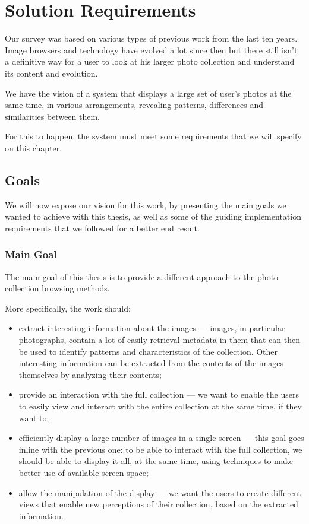 \chapter{Solution Requirements} %
\label{chapter:solution_requirements}

Our survey was based on various types of previous work from the last ten years. Image browsers and technology have evolved a lot since then but there still isn't a definitive way for a user to look at his larger photo collection and understand its content and evolution.

We have the vision of a system that displays a large set of user’s photos at the same time, in various arrangements, revealing patterns, differences and similarities between them.

For this to happen, the system must meet some requirements that we will specify on this chapter.


\section{Goals} %
\label{sec:goals}

We will now expose our vision for this work, by presenting the main goals we wanted to achieve with this thesis, as well as some of the guiding implementation requirements that we followed for a better end result.

\subsection{Main Goal} %
\label{sub:main_goal}

The main goal of this thesis is to provide a different approach to the photo collection browsing methods.

More specifically, the work should:

\begin{itemize}
	\item{extract interesting information about the images — images, in particular photographs, contain a lot of easily retrieval metadata in them that can then be used to identify patterns and characteristics of the collection. Other interesting information can be extracted from the contents of the images themselves by analyzing their contents;}


	\item{provide an interaction with the full collection — we want to enable the users to easily view and interact with the entire collection at the same time, if they want to;}

	\item{efficiently display a large number of images in a single screen — this goal goes inline with the previous one: to be able to interact with the full collection, we should be able to display it all, at the same time, using techniques to make better use of available screen space;}

	\item{allow the manipulation of the display — we want the users to create different views that enable new perceptions of their collection, based on the extracted information.}

\end{itemize}

